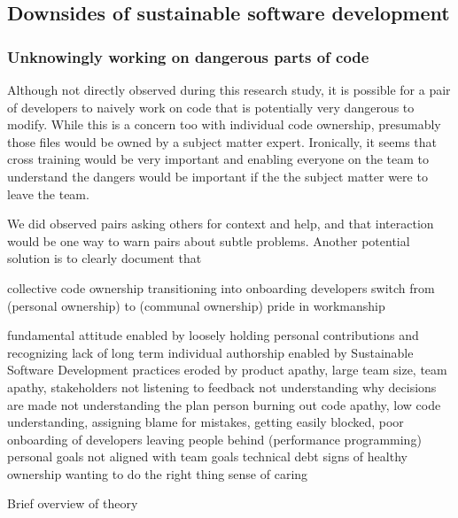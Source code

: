 \begin{table}[]
\subsection{Downsides of sustainable software development}
\subsubsection{Unknowingly working on dangerous parts of code}
Although not directly observed during this research study, it is possible for a pair of developers to naively work on code that is potentially very dangerous to modify. While this is a concern too with individual code ownership, presumably those files would be owned by a subject matter expert. Ironically, it seems that cross training would be very important and enabling everyone on the team to understand the dangers would be important if the the subject matter were to leave the team.  

We did observed pairs asking others for context and help, and that interaction would be one way to warn pairs about subtle problems. Another potential solution is to clearly document that  




collective code ownership
transitioning into
onboarding developers switch from  (personal ownership) to  (communal ownership) pride in workmanship



fundamental attitude
enabled by loosely holding personal contributions and recognizing lack of long term individual authorship
enabled by
Sustainable Software Development practices
eroded by
product apathy, 
large team size, 
team apathy, 
stakeholders not listening to feedback
not understanding why decisions are made
not understanding the plan
person burning out
code apathy, 
low code understanding, 
assigning blame for mistakes, 
getting easily blocked,
poor onboarding of developers
leaving people behind (performance programming)
personal goals not aligned with team goals
technical debt
signs of healthy ownership
wanting to do the right thing
sense of caring


Brief overview of theory


\end{table}
